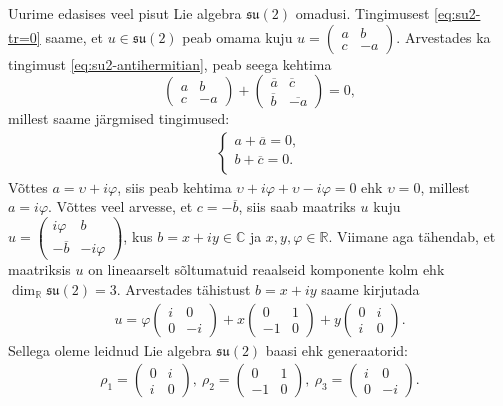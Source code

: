 \documentclass[12pt,a4paper,oneside]{article}
\theoremstyle{plain}
\theoremstyle{definition}
\numberwithin{equation}{section}
\def\R{{\mathbb R}}
\def\C{{\mathbb C}}
\def\su2{{\mathfrak{ su}\left(2\right)}}
\begin{document}
Uurime edasises veel pisut Lie algebra $\su2$ omadusi. Tingimusest 
\ref{eq:su2-tr=0} saame, et $u \in \su2$ peab omama kuju 
$u = \begin{pmatrix} a & b \\ c & -a\end{pmatrix}$. Arvestades ka 
tingimust \ref{eq:su2-antihermitian}, peab seega kehtima
\[\begin{pmatrix} a & b \\ c & -a\end{pmatrix} + \begin{pmatrix} 
\overline{a} & \overline{c} \\ \overline{b} & \overline{-a} 
\end{pmatrix} = 0,\]
millest saame järgmised tingimused:
\begin{align*}
\begin{cases}
    a + \overline{a} = 0, \\
    b + \overline{c} = 0. \\
  \end{cases}
\end{align*}
Võttes $a = \upsilon + i\varphi$, siis peab kehtima 
$\upsilon + i\varphi + \upsilon - i\varphi = 0$ ehk $\upsilon = 0$, 
millest $a = i\varphi$. Võttes veel arvesse, et $c = -\overline{b}$, 
siis saab maatriks $u$ kuju $u = \begin{pmatrix} i\varphi & b \\ 
-\overline{b} & -i\varphi \end{pmatrix}$, kus $b=x+iy \in \C$ ja 
$x, y, \varphi \in \R$. Viimane aga tähendab, et maatriksis $u$ 
on lineaarselt sõltumatuid reaalseid komponente kolm ehk 
$\dim_{\R} \su2 = 3$. Arvestades tähistust $b = x + iy$ saame 
kirjutada
\begin{align*}
u = \varphi \begin{pmatrix} i & 0 \\ 0 & -i \end{pmatrix} + 
x \begin{pmatrix} 0 & 1 \\ -1 & 0 \end{pmatrix} + 
y \begin{pmatrix} 0 & i \\ i & 0 \end{pmatrix}.
\end{align*}
Sellega oleme leidnud Lie algebra $\su2$ baasi ehk generaatorid:
\begin{align*}
\rho_1 = \begin{pmatrix} 0 & i \\ i & 0 \end{pmatrix},\ \rho_2 = 
\begin{pmatrix} 0 & 1 \\ -1 & 0 \end{pmatrix},\ \rho_3 = 
\begin{pmatrix} i & 0 \\ 0 & -i \end{pmatrix}.
\end{align*}
\end{document}
